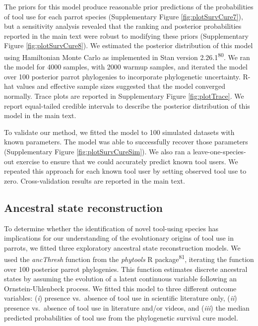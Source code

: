\documentclass[
  man,floatsintext]{apa6}
\begin{document}
The priors for this model produce reasonable prior predictions of the probabilities of tool use for each parrot species (Supplementary Figure \ref{fig:plotSurvCure7}), but a sensitivity analysis revealed that the ranking and posterior probabilities reported in the main text were robust to modifying these priors (Supplementary Figure \ref{fig:plotSurvCure8}). We estimated the posterior distribution of this model using Hamiltonian Monte Carlo as implemented in Stan version 2.26.1\textsuperscript{80}. We ran the model for 4000 samples, with 2000 warmup samples, and iterated the model over 100 posterior parrot phylogenies to incorporate phylogenetic uncertainty. R-hat values and effective sample sizes suggested that the model converged normally. Trace plots are reported in Supplementary Figure \ref{fig:plotTrace}. We report equal-tailed credible intervals to describe the posterior distribution of this model in the main text.

To validate our method, we fitted the model to 100 simulated datasets with known parameters. The model was able to successfully recover those parameters (Supplementary Figure \ref{fig:plotSurvCureSim}). We also ran a leave-one-species-out exercise to ensure that we could accurately predict known tool users. We repeated this approach for each known tool user by setting observed tool use to zero. Cross-validation results are reported in the main text.

\hypertarget{ancestral-state-reconstruction}{%
\subsection{Ancestral state reconstruction}\label{ancestral-state-reconstruction}}

To determine whether the identification of novel tool-using species has implications for our understanding of the evolutionary origins of tool use in parrots, we fitted three exploratory ancestral state reconstruction models. We used the \emph{ancThresh} function from the \emph{phytools} R package\textsuperscript{81}, iterating the function over 100 posterior parrot phylogenies. This function estimates discrete ancestral states by assuming the evolution of a latent continuous variable following an Ornstein-Uhlenbeck process. We fitted this model to three different outcome variables: (\emph{i}) presence vs.~absence of tool use in scientific literature only, (\emph{ii}) presence vs.~absence of tool use in literature and/or videos, and (\emph{iii}) the median predicted probabilities of tool use from the phylogenetic survival cure model.
\end{document}
